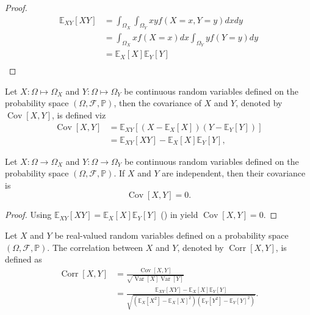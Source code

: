\begin{proof}
	\begin{equation}
		\begin{split}
			\mathbb{E}_{XY}[XY] &= \int_{\Omega_X}\int_{\Omega_Y} x y f(X=x,Y=y)dxdy\\
			&= \int_{\Omega_X} x f(X=x)dx\int_{\Omega_Y}yf(Y=y)dy\\
			&= \mathbb{E}_X[X]\mathbb{E}_Y[Y]\\
		\end{split}
	\end{equation}
\end{proof}

\begin{definition}[Covariance]
	\label{def:covariance}
	Let $X: \Omega \mapsto \Omega_X$ and $Y: \Omega \mapsto \Omega_Y$ be continuous random variables defined on the probability space $(\Omega, \mathcal{F}, \mathbb{P})$, then the covariance of $X$ and $Y$, denoted by $\operatorname{Cov}[X,Y]$, is defined viz
	\begin{equation}
		\begin{split}
			\operatorname{Cov}[X,Y]&=\mathbb{E}_{XY}[(X-\mathbb{E}_X[X])(Y-\mathbb{E}_Y[Y])]\\
			&=\mathbb{E}_{XY}[XY]-\mathbb{E}_X[X]\mathbb{E}_Y[Y],
		\end{split}
	\end{equation}
\end{definition}
\begin{theorem}
	\label{theorem:covariance_of_independent_variables}
	Let $X: \Omega \to \Omega_X$ and $Y: \Omega \to \Omega_Y$ be continuous random variables defined on the probability space $(\Omega, \mathcal{F}, \mathbb{P})$. If $X$ and $Y$ are independent, then their covariance is
	\begin{equation}
		\operatorname{Cov}[X,Y] = 0.
	\end{equation}
	
\end{theorem}
\begin{proof}
	Using $\mathbb{E}_{XY}[XY]=\mathbb{E}_X[X]\mathbb{E}_Y[Y]$ () in  yield $\operatorname{Cov}[X,Y]=0$.
\end{proof}


\begin{definition}[Correlation]
	Let $X$ and $Y$ be real-valued random variables defined on a probability space $(\Omega, \mathcal{F},\mathbb{P})$. The correlation between $X$ and $Y$, denoted by $\operatorname{Corr}[X,Y]$, is defined as
	\begin{equation}
		\begin{split}
			\operatorname{Corr}[X,Y] &= \frac{\operatorname{Cov}[X,Y]}{\sqrt{\operatorname{Var}[X]  \operatorname{Var}[Y]}} \\
			&= \frac{\mathbb{E}_{XY}[XY]-\mathbb{E}_X[X]\mathbb{E}_Y[Y]}{\sqrt{\left(\mathbb{E}_X[X^2] - \mathbb{E}_X[X]^2\right) \left(\mathbb{E}_Y[Y^2] - \mathbb{E}_Y[Y]^2\right)}}.
		\end{split}
	\end{equation}
\end{definition}

